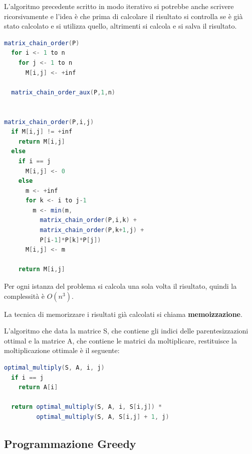\documentclass[a4paper]{article}
\begin{document}
\vspace{1em}
\noindent
L'algoritmo precedente scritto in modo iterativo si potrebbe anche scrivere ricorsivamente
e l'idea è che prima di calcolare il risultato si controlla se è già stato calcolato
e si utilizza quello, altrimenti si calcola e si salva il risultato.
\begin{lstlisting}[language=Scala]
matrix_chain_order(P)
  for i <- 1 to n
    for j <- 1 to n
      M[i,j] <- +inf

  matrix_chain_order_aux(P,1,n)


matrix_chain_order(P,i,j)
  if M[i,j] != +inf
    return M[i,j]
  else
    if i == j
      M[i,j] <- 0
    else
      m <- +inf
      for k <- i to j-1
        m <- min(m,
          matrix_chain_order(P,i,k) +
          matrix_chain_order(P,k+1,j) +
          P[i-1]*P[k]*P[j])
      M[i,j] <- m

    return M[i,j]
\end{lstlisting}
Per ogni istanza del problema si calcola una sola volta il risultato, quindi la complessità
è \( O(n^3) \).

\vspace{1em}
\noindent
\begin{definition}
  La tecnica di memorizzare i risultati già calcolati si chiama \textbf{memoizzazione}.
\end{definition}

\vspace{1em}
\noindent
L'algoritmo che data la matrice S, che contiene gli indici delle parentesizzazioni
ottimal e la matrice A, che contiene le matrici da moltiplicare, restituisce la
moltiplicazione ottimale è il seguente:
\begin{lstlisting}[language=Scala]
optimal_multiply(S, A, i, j)
  if i == j
    return A[i]

  return optimal_multiply(S, A, i, S[i,j]) *
         optimal_multiply(S, A, S[i,j] + 1, j)
\end{lstlisting}

\subsection{Programmazione Greedy}
\end{document}
